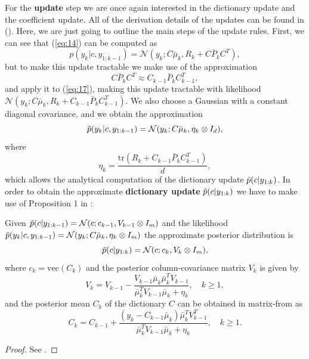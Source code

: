 \documentclass{mldsmsc}
\begin{document}
\noindent For the \textbf{update} step we are once again interested in the dictionary update and the coefficient update. All of the derivation details of the updates can be found in (\cite{akyildiz2021probabilistic}). Here, we are just going to outline the main steps of the update rules. First, we can see that (\ref{eq:14}) can be computed as
\begin{equation} \label{eq:17}
    p(y_k | c, y_{1:k-1}) = \mathcal{N}(y_k; C \bar{\mu}_k, R_k + C \bar{P}_k C^T),
\end{equation}
but to make this update tractable we make use of the approximation
\begin{equation}
    C \bar{P}_k C^T \approx C_{k-1} \bar{P}_k C^T_{k-1},
\end{equation}
and apply it to (\ref{eq:17}), making this update tractable with likelihood $\mathcal{N}(y_k; C \bar{\mu}_k, R_k + C_{k-1} \bar{P}_k C_{k-1}^T)$. We also choose a Gaussian with a constant diagonal covariance, and we obtain the approximation
\begin{equation}\label{eq:18}
    \Tilde{p}(y_k | c, y_{1:k-1}) = \mathcal{N}(y_k; C \bar{\mu}_k, \eta_k \otimes I_d),
\end{equation}
where 
\begin{equation}
    \eta_k = \frac{\text{tr}(R_k + C_{k-1} \bar{P}_{k} C_{k-1}^{T})}{d},
\end{equation}
which allows the analytical computation of the dictionary update $\Tilde{p}(c | y_{1:k})$. In order to obtain the approximate \textbf{dictionary update} $\Tilde{p}(c | y_{1:k})$ we have to make use of Proposition 1 in \cite{akyildiz2021probabilistic}:
\begin{proposition}\label{prop:1}
    Given $\Tilde{p}(c | y_{1:k-1}) = \mathcal{N}(c; c_{k-1}, V_{k-1} \otimes I_m)$ and the likelihood $\Tilde{p}(y_k | c, y_{1:k-1}) = \mathcal{N}(y_k; C \bar{\mu}_k, \eta_k \otimes I_m)$ the approximate posterior distribution is
    \begin{equation}
        \Tilde{p}(c | y_{1:k}) = \mathcal{N}(c; c_k, V_k \otimes I_m),
    \end{equation}
    where $c_k = \text{vec}(C_k)$ and the posterior column-covariance matrix $V_k$ is given by
    \begin{equation}\label{eq:19}
        V_k = V_{k-1} - \frac{V_{k-1} \bar{\mu}_k \bar{\mu}^T_k V_{k-1}}{\bar{\mu}_k^T V_{k-1} \bar{\mu}_k + \eta_k}, \quad k \geq 1,
    \end{equation}
    and the posterior mean $C_k$ of the dictionary $C$ can be obtained in matrix-from as
    \begin{equation}
        C_k = C_{k-1} + \frac{(y_k - C_{k-1}\bar{\mu}_k)\bar{\mu}_k^T V_{k-1}^T}{\bar{\mu}_k^T V_{k-1} \bar{\mu}_k + \eta_k}, \quad k \geq 1.
    \end{equation}
\end{proposition}
\begin{proof}
    See \cite{akyildiz2021probabilistic}.
\end{proof}\newline
\end{document}
